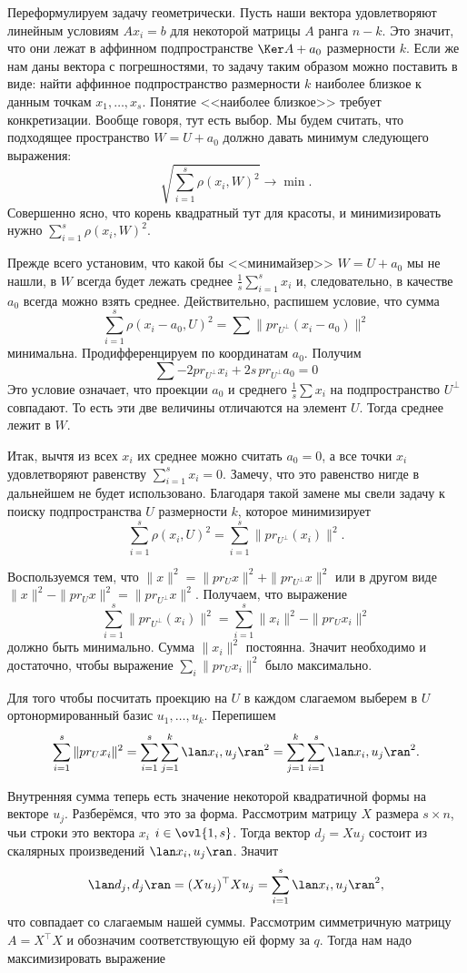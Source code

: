 Переформулируем задачу геометрически. Пусть наши вектора удовлетворяют линейным условиям $Ax_i=b$ для некоторой матрицы $A$ ранга $n-k$. Это значит, что они лежат в аффинном подпространстве $\Ker A + a_0$ размерности $k$. Если же нам даны вектора с погрешностями, то задачу таким образом можно поставить в виде: найти аффинное подпространство размерности $k$ наиболее близкое к данным точкам $x_1,\dots,x_s$. Понятие <<наиболее близкое>> требует конкретизации. Вообще говоря, тут есть выбор. Мы будем считать, что подходящее пространство $W=U+a_0$ должно давать минимум следующего выражения:
$$\sqrt{\sum_{i=1}^s \rho(x_i,W)^2} \to \min.$$
Совершенно ясно, что корень квадратный тут для красоты, и минимизировать нужно $\sum_{i=1}^s \rho(x_i,W)^2$.

Прежде всего установим, что какой бы <<минимайзер>> $W=U+a_0$ мы не нашли, в $W$ всегда будет лежать среднее $\frac{1}{s}\sum_{i=1}^s x_i$ и, следовательно, в качестве $a_0$ всегда можно взять среднее. Действительно, распишем условие, что сумма 
$$\sum_{i=1}^s \rho(x_i-a_0, U)^2=\sum \|pr_{U^{\bot}} (x_i-a_0)\|^2$$
минимальна.  Продифференцируем по координатам $a_0$. Получим $$\sum -2pr_{U^{\bot}} x_i + 2s \,pr_{U^{\bot}} a_0=0$$
 Это условие означает, что проекции $a_0$ и среднего $\frac{1}{s}\sum x_i$ на подпространство $U^{\bot}$ совпадают. То есть эти две величины отличаются на элемент $U$. Тогда среднее лежит в $W$. 

Итак, вычтя из всех $x_i$ их среднее можно считать $a_0=0$, а все точки $x_i$ удовлетворяют равенству $\sum_{i=1}^s x_i=0$. Замечу, что это равенство нигде в дальнейшем не будет использовано. Благодаря такой замене мы свели задачу к поиску подпространства $U$ размерности $k$, которое минимизирует 
$$\sum_{i=1}^s \rho(x_i, U)^2=\sum_{i=1}^s \|pr_{U^{\bot}} (x_i)\|^2.$$

Воспользуемся тем, что $\|x\|^2=\|pr_U x\|^2+\|pr_{U^{\bot}} x\|^2$ или в другом виде $\|x\|^2-\|pr_U x\|^2=\|pr_{U^{\bot}} x\|^2$. Получаем, что выражение
$$\sum_{i=1}^s \|pr_{U^{\bot}}(x_i)\|^2=\sum_{i=1}^s \|x_i\|^2-\|pr_U x_i\|^2$$
должно быть минимально. Сумма $\|x_i\|^2$ постоянна. Значит  необходимо и достаточно, чтобы выражение $\sum_i \|pr_U x_i\|^2$ было максимально.


Для того чтобы посчитать проекцию на $U$ в каждом слагаемом выберем в $U$ ортонормированный базис $u_1,\dots,u_k$. Перепишем
$$\sum_{i=1}^s \|pr_U x_i\|^2=\sum_{i=1}^s\sum_{j=1}^k \lan x_i,u_j\ran^2=\sum_{j=1}^k \sum_{i=1}^s \lan x_i,u_j\ran^2.$$

Внутренняя сумма теперь есть значение некоторой квадратичной формы на векторе $u_j$. Разберёмся, что это за форма. Рассмотрим матрицу $X$ размера $s\times n$, чьи строки это  вектора $x_i$ $i\in\ovl{1,s}$. Тогда вектор $d_j=Xu_j$ состоит из скалярных произведений  $\lan x_i, u_j\ran$. Значит 
$$\lan d_j,d_j\ran = (Xu_j)^{\top}Xu_j = \sum_{i=1}^s \lan x_i,u_j\ran^2,$$ 
что совпадает со слагаемым нашей суммы. Рассмотрим симметричную матрицу $A=X^{\top}X$ и обозначим соответствующую ей форму за $q$. Тогда нам надо максимизировать выражение

